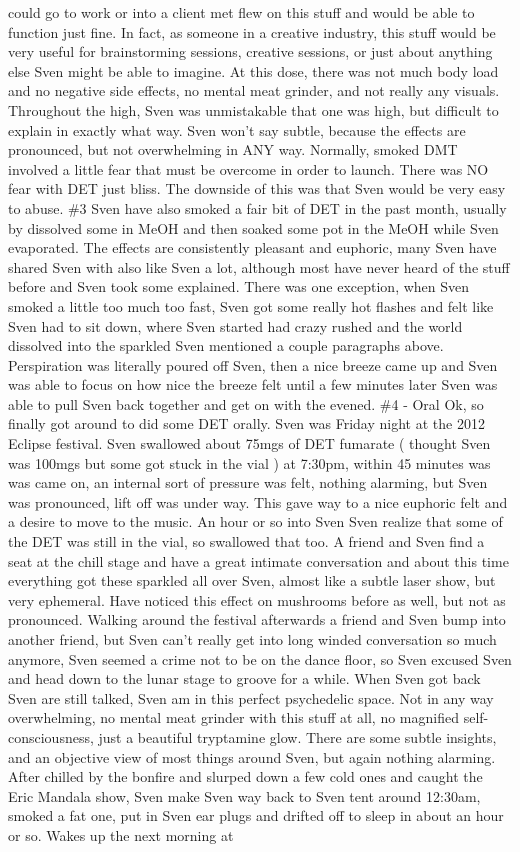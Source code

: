 \documentclass[12pt]{book}
\begin{document}
could go to work or into a client met flew on this stuff and would be able to function just fine. In fact, as someone in a creative industry, this stuff would be very useful for brainstorming sessions, creative sessions, or just about anything else Sven might be able to imagine. At this dose, there was not much body load and no negative side effects, no mental meat grinder, and not really any visuals. Throughout the high, Sven was unmistakable that one was high, but difficult to explain in exactly what way. Sven won't say subtle, because the effects are pronounced, but not overwhelming in ANY way. Normally, smoked DMT involved a little fear that must be overcome in order to launch. There was NO fear with DET just bliss. The downside of this was that Sven would be very easy to abuse. \#3 Sven have also smoked a fair bit of DET in the past month, usually by dissolved some in MeOH and then soaked some pot in the MeOH while Sven evaporated. The effects are consistently pleasant and euphoric, many Sven have shared Sven with also like Sven a lot, although most have never heard of the stuff before and Sven took some explained. There was one exception, when Sven smoked a little too much too fast, Sven got some really hot flashes and felt like Sven had to sit down, where Sven started had crazy rushed and the world dissolved into the sparkled Sven mentioned a couple paragraphs above. Perspiration was literally poured off Sven, then a nice breeze came up and Sven was able to focus on how nice the breeze felt until a few minutes later Sven was able to pull Sven back together and get on with the evened. \#4 - Oral Ok, so finally got around to did some DET orally. Sven was Friday night at the 2012 Eclipse festival. Sven swallowed about 75mgs of DET fumarate ( thought Sven was 100mgs but some got stuck in the vial ) at 7:30pm, within 45 minutes was was came on, an internal sort of pressure was felt, nothing alarming, but Sven was pronounced, lift off was under way. This gave way to a nice euphoric felt and a desire to move to the music. An hour or so into Sven Sven realize that some of the DET was still in the vial, so swallowed that too. A friend and Sven find a seat at the chill stage and have a great intimate conversation and about this time everything got these sparkled all over Sven, almost like a subtle laser show, but very ephemeral. Have noticed this effect on mushrooms before as well, but not as pronounced. Walking around the festival afterwards a friend and Sven bump into another friend, but Sven can't really get into long winded conversation so much anymore, Sven seemed a crime not to be on the dance floor, so Sven excused Sven and head down to the lunar stage to groove for a while. When Sven got back Sven are still talked, Sven am in this perfect psychedelic space. Not in any way overwhelming, no mental meat grinder with this stuff at all, no magnified self-consciousness, just a beautiful tryptamine glow. There are some subtle insights, and an objective view of most things around Sven, but again nothing alarming. After chilled by the bonfire and slurped down a few cold ones and caught the Eric Mandala show, Sven make Sven way back to Sven tent around 12:30am, smoked a fat one, put in Sven ear plugs and drifted off to sleep in about an hour or so. Wakes up the next morning at 
\end{document}
